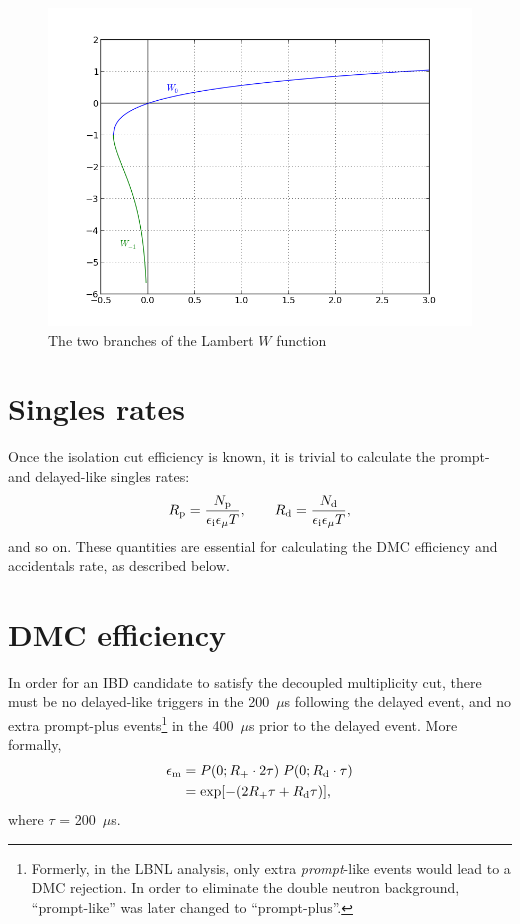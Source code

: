 \documentclass[../thesis.tex]{subfiles}
\begin{document}
\begin{figure}
  \centering \includegraphics[scale=0.7]{../images/lambertW.png}
  \caption{The two branches of the Lambert $W$ function}
  \label{fig:lambertW}
\end{figure}

\section{Singles rates}
\label{sec:singratescalc}

Once the isolation cut efficiency is known, it is trivial to calculate the
prompt- and delayed-like singles rates:
\begin{equation}
  \label{eq:accSingRates}
  R_\mathrm{p} = \frac{N_\mathrm{p}}{\epsilon_\mathrm{i} \epsilon_\mathrm{\mu} T},\qquad
  R_\mathrm{d} = \frac{N_\mathrm{d}}{\epsilon_\mathrm{i} \epsilon_\mathrm{\mu} T},
\end{equation}
and so on. These quantities are essential for calculating the DMC efficiency and accidentals rate, as described below.

\section{DMC efficiency}
\label{sec:dmceffcalc}

\def\edmc{\ensuremath{\epsilon_\mathrm{m}}}

In order for an IBD candidate to satisfy the decoupled multiplicity cut, there
must be no delayed-like triggers in the 200~$\mu$s following the delayed event,
and no extra prompt-plus events\footnote{Formerly, in the LBNL analysis, only
  extra \emph{prompt}-like events would lead to a DMC rejection. In order to
  eliminate the double neutron background, ``prompt-like'' was later changed to
  ``prompt-plus''.} in the 400~$\mu$s prior to the delayed event. More formally,
\begin{align}
  \edmc &= P(0; \Rplu \cdot 2\tau)\;P(0; \Rdel \cdot \tau) \nonumber \\
        &= \exp [-(2\Rplu\tau + \Rdel\tau)],
          \label{eq:dmcEff}
\end{align}
where $\tau$ = 200~$\mu$s.
\end{document}
